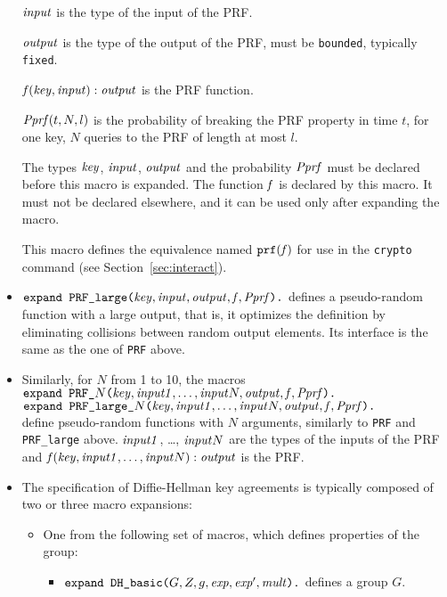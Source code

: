 \documentclass{article}
\begin{document}
\begin{itemize}
   $\mathit{input}$ is the type of the input of the PRF.

   $\mathit{output}$ is the type of the output of the PRF, must be \texttt{bounded}, typically \texttt{fixed}.

   $\mathit{f}(\mathit{key}, \mathit{input}):\mathit{output}$ is the PRF function.

   $\mathit{Pprf}(t, N, l)$ is the probability of breaking the PRF property
   in time $t$, for one key, $N$ queries to the PRF of length at most $l$.

   The types $\mathit{key}$, $\mathit{input}$, $\mathit{output}$
   and the probability $\mathit{Pprf}$ must be declared before this macro
   is expanded. The function $\mathit{f}$ is declared by
   this macro. It must not be declared elsewhere, and it can be
   used only after expanding the macro.

   This macro defines the equivalence named $\texttt{prf}(\mathit{f})$
   for use in the \texttt{crypto} command 
   (see Section~\ref{sec:interact}).

\item $\texttt{expand PRF\_large(}\mathit{key}, \mathit{input}, \mathit{output}, \mathit{f}, \mathit{Pprf}\texttt{).}$ 
defines a pseudo-random function with a large output, that is, it optimizes the 
definition by eliminating collisions between random output elements.
Its interface is the same as the one of \texttt{PRF} above.

 \item Similarly, for $N$ from 1 to 10, the macros\\
$\texttt{expand PRF\_$N$(}\mathit{key}, \mathit{input1}, \dots, \mathit{input}N, \mathit{output}, \mathit{f}, \mathit{Pprf}\texttt{).}$ \\
$\texttt{expand PRF\_large\_$N$(}\mathit{key}, \mathit{input1}, \dots, \mathit{input}N, \mathit{output}, \mathit{f}, \mathit{Pprf}\texttt{).}$ \\
define pseudo-random functions with $N$ arguments, 
similarly to \texttt{PRF} and \texttt{PRF\_large} above.
$\mathit{input1}$, \dots, $\mathit{input}N$ are the types of the inputs of the PRF and
$\mathit{f}(\mathit{key}, \mathit{input1}, \dots, \mathit{input}N):\mathit{output}$ is the PRF.

 \item The specification of Diffie-Hellman key agreements is typically composed of two or three macro expansions:

   \begin{itemize}
   \item One from the following set of macros, which defines properties of the group:
     \begin{itemize}
     \item $\texttt{expand\ DH\_basic(}G, Z, g, \mathit{exp}, \mathit{exp}', \mathit{mult}\texttt{).}$ defines a group $G$.


\end{itemize}
\end{itemize}
\end{itemize}
\end{document}
